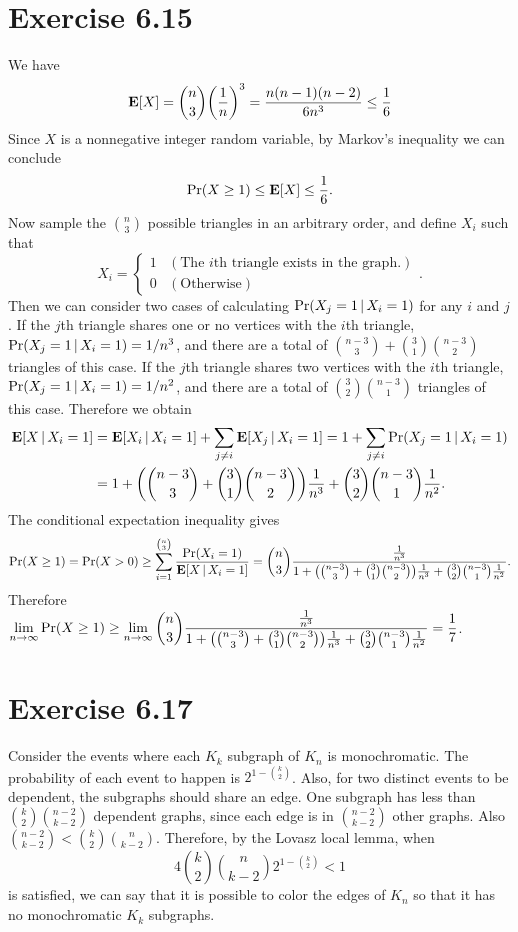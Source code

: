 \documentclass{article}
\begin{document}
\section*{Exercise 6.15}
We have
$$\mathbf{E}\qty[X] = {n \choose 3}\qty(\frac{1}{n})^3 = \frac{n(n-1)(n-2)}{6n^3} \leq \frac{1}{6}$$
Since $X$ is a nonnegative integer random variable, by Markov's inequality we can conclude 
$$\mathrm{Pr}\qty(X \geq 1) \leq \mathbf{E}\qty[X] \leq \frac{1}{6}.$$
Now sample the ${n \choose 3}$ possible triangles in an arbitrary order, and define $X_i$ such that
$$X_i = \begin{cases}
    1 & (\text{The }i\text{th triangle exists in the graph.}) \\
    0 & (\text{Otherwise})
\end{cases}.$$
Then we can consider two cases of calculating $\mathrm{Pr}\qty(X_j=1 \,|\, X_i=1)$ for any $i$ and $j$. 
If the $j$th triangle shares one or no vertices with the $i$th triangle, $\mathrm{Pr}\qty(X_j=1 \,|\, X_i=1) = {1}/{n^3}$, and there are a total of ${n-3 \choose 3} + {3 \choose 1}{n-3 \choose 2}$ triangles of this case.
If the $j$th triangle shares two vertices with the $i$th triangle, $\mathrm{Pr}\qty(X_j=1 \,|\, X_i=1) = {1}/{n^2}$, and there are a total of ${3 \choose 2}{n-3 \choose 1}$ triangles of this case.
Therefore we obtain
\begin{align*}
    \mathbf{E}\qty[X \,|\, X_i = 1] &= \mathbf{E}\qty[X_i \,|\, X_i = 1] + \sum_{j \neq i}\mathbf{E}\qty[X_j \,|\, X_i = 1] = 1 + \sum_{j \neq i}\mathrm{Pr}\qty(X_j = 1 \,|\, X_i = 1) \\
    &= 1 + \qty({n-3 \choose 3} + {3 \choose 1}{n-3 \choose 2})\frac{1}{n^3} + {3 \choose 2}{n-3 \choose 1}\frac{1}{n^2}.
\end{align*}
The conditional expectation inequality gives
$$\mathrm{Pr}\qty(X \geq 1) = \mathrm{Pr}\qty(X > 0) \geq \sum_{i=1}^{{n \choose 3}}\frac{\mathrm{Pr}\qty(X_i = 1)}{\mathbf{E}\qty[X \,|\, X_i = 1]} = {n \choose 3}\frac{\frac{1}{n^3}}{1 + \qty({n-3 \choose 3} + {3 \choose 1}{n-3 \choose 2})\frac{1}{n^3} + {3 \choose 2}{n-3 \choose 1}\frac{1}{n^2}}.$$
Therefore $\displaystyle \lim_{n \to \infty} \mathrm{Pr}\qty(X \geq 1) \geq \lim_{n \to \infty}{n \choose 3}\frac{\frac{1}{n^3}}{1 + \qty({n-3 \choose 3} + {3 \choose 1}{n-3 \choose 2})\frac{1}{n^3} + {3 \choose 2}{n-3 \choose 1}\frac{1}{n^2}} = \frac{1}{7}$.

\section*{Exercise 6.17}
Consider the events where each $K_k$ subgraph of $K_n$ is monochromatic. 
The probability of each event to happen is $2^{1 - {k \choose 2}}$. 
Also, for two distinct events to be dependent, the subgraphs should share an edge. 
One subgraph has less than ${k \choose 2}{n-2 \choose k-2}$ dependent graphs, since each edge is in ${n-2 \choose k-2}$ other graphs. Also ${n-2 \choose k-2} < {k \choose 2}{n \choose k-2}$. 
Therefore, by the Lovasz local lemma, when
$$4{k \choose 2}{n \choose k-2}2^{1 - {k \choose 2}} < 1$$
is satisfied, we can say that it is possible to color the edges of $K_n$ so that it has no monochromatic $K_k$ subgraphs.
\end{document}

